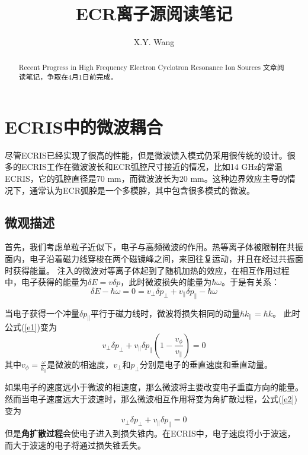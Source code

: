 \documentclass[fontset=windows]{article}
\title{ECR离子源阅读笔记}
\author{X.Y. Wang}
\begin{document}
\maketitle

\begin{abstract}
Recent Progress in High Frequency Electron Cyclotron Resonance Ion Sources 文章阅读笔记，争取在4月1日前完成。
\end{abstract}

\section{ECRIS中的微波耦合}
尽管ECRIS已经实现了很高的性能，但是微波馈入模式仍采用很传统的设计。很多的ECRIS工作在微波波长和ECR弧腔尺寸接近的情况，比如14 GHz的常温ECRIS，它的弧腔直径是70 mm，而微波波长为20 mm。这种边界效应主导的情况下，通常认为ECR弧腔是一个多模腔，其中包含很多模式的微波。

\subsection{微观描述}
首先，我们考虑单粒子近似下，电子与高频微波的作用。热等离子体被限制在共振面内，电子沿着磁力线穿梭在两个磁镜峰之间，来回往复运动，并且在经过共振面时获得能量。
注入的微波对等离子体起到了随机加热的效应，在相互作用过程中，电子获得的能量为$ \delta E = v \delta p $，此时微波损失的能量为$\hbar \omega$。于是有关系：
\begin{equation}
\delta E-\hbar\omega=0=v_\perp \delta p_\perp +v_\parallel \delta p_\parallel-\hbar\omega
\label{e1}
\end{equation}

当电子获得一个冲量$\delta p_\parallel$平行于磁力线时，微波将损失相同的动量$\hbar k_\parallel=\hbar k$。
此时公式(\ref{e1})变为
\begin{equation}
v_\perp \delta p_\perp +v_\parallel \delta p_\parallel(1-\frac{v_\phi}{v_\parallel})=0
\label{e2}
\end{equation}
其中$v_\phi=\frac{\omega}{k_\parallel}$是微波的相速度，$v_\perp$和$p_\perp$分别是电子的垂直速度和垂直动量。

如果电子的速度远小于微波的相速度，那么微波将主要改变电子垂直方向的能量。然而当电子速度远大于波速时，那么微波相互作用将变为角扩散过程，公式(\ref{e2})变为
\begin{equation}
v_\perp \delta p_\perp +v_\parallel \delta p_\parallel=0
\label{e3}
\end{equation}
但是\textbf{角扩散过程}会使电子进入到损失锥内。在ECRIS中，电子速度将小于波速，而大于波速的电子将通过损失锥丢失。
\end{document}
